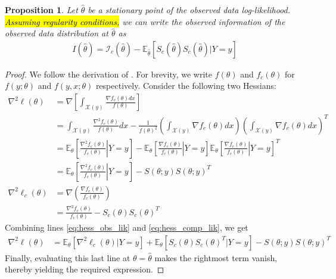 \documentclass[11pt, oneside]{article}   	%
\newcommand{\bE}{\mathbb{E}}
\newtheorem{proposition}{Proposition}[section]
\begin{document}
\begin{proposition}
    \label{thm:info_decomp}
    Let $\hat{\theta}$ be a stationary point of the observed data log-likelihood. \hl{Assuming regularity conditions,} we can write the observed information of the observed data distribution at $\hat{\theta}$ as
    \begin{align}
        I(\hat{\theta}) = \mathcal{I}_c(\hat{\theta})  - \bE_{\hat{\theta}} [ S_c(\hat{\theta}) S_c(\hat{\theta}) | Y=y]
    \end{align}
\end{proposition}

\begin{proof}
    We follow the derivation of \citet{Lou82}. For brevity, we write $f(\theta)$ and $f_c(\theta)$ for $f(y; \theta)$ and $f(y, x; \theta)$ respectively. Consider the following two Hessians:
    \begin{align}
        \nabla^2 \ell(\theta) &= \nabla \left[ \int_{\mathcal{X}(y)} \frac{\nabla f_c(\theta) dx}{f(\theta)} \right]\\
        &= \int_{\mathcal{X}(y)} \frac{\nabla^2 f_c(\theta)}{f(\theta)} dx - \frac{1}{f(\theta)^2}\left( \int_{\mathcal{X}(y)} \nabla f_c(\theta) dx \right) \left( \int_{\mathcal{X}(y)} \nabla f_c(\theta) dx \right)^T\\
        &= \bE_\theta \left[ \left. \frac{\nabla^2 f_c(\theta)}{f_c(\theta)} \right| Y=y \right] - \bE_\theta \left[ \left. \frac{\nabla f_c(\theta)}{f_c(\theta)} \right| Y=y \right] \bE_\theta \left[ \left. \frac{\nabla f_c(\theta)}{f_c(\theta)} \right| Y=y \right]^T\\
        &= \bE_\theta \left[ \left. \frac{\nabla^2 f_c(\theta)}{f_c(\theta)} \right| Y=y \right] - S(\theta; y) S(\theta; y)^T \label{eq:hess_obs_lik}\\
        \nabla^2 \ell_c(\theta) &= \nabla \left( \frac{\nabla f_c(\theta)}{f_c(\theta)} \right)\\
        &= \frac{\nabla^2 f_c(\theta)}{f_c(\theta)} - S_c(\theta) S_c(\theta)^T \label{eq:hess_comp_lik}
    \end{align}
    Combining lines \ref{eq:hess_obs_lik} and \ref{eq:hess_comp_lik}, we get
    \begin{align}
        \nabla^2 \ell(\theta) &= \bE_\theta [ \nabla^2 \ell_c(\theta) | Y=y] + \bE_\theta [ S_c(\theta) S_c(\theta)^T | Y=y] - S(\theta; y) S(\theta; y)^T \label{eq:hess_obs_lik2}
    \end{align}
    Finally, evaluating this last line at $\theta = \hat{\theta}$ makes the rightmost term vanish, thereby yielding the required expression.
\end{proof}
\end{document}
